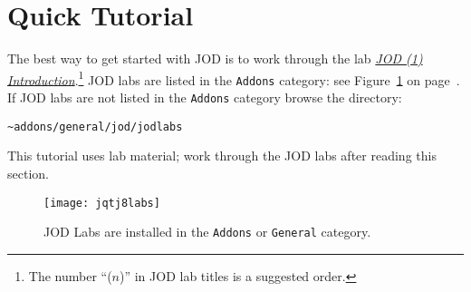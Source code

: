 \section{Quick Tutorial}

The best way to get started with JOD is to work through the
lab \href{https://github.com/bakerjd99/jod/blob/master/jodnotebooks/JODIntroductionLab.pdf}{\emph{JOD (1) Introduction}}.\footnote{The number 
``($n$)'' in JOD lab titles is a suggested order.}
JOD labs are listed in the \texttt{Addons} category: see 
Figure~\ref{eps:jodlabs} on page~\pageref{eps:jodlabs}. If
JOD labs are not listed in the \texttt{Addons} category browse 
the directory:
\begin{lstlisting}[frame=single,framerule=0pt]
~addons/general/jod/jodlabs
\end{lstlisting}
This tutorial uses lab material; work through the JOD labs after reading this section.





\begin{figure}[htbp]
  \centering
  \texttt{[image: jqtj8labs]}
  \caption[JOD Labs]{JOD Labs are installed in the \texttt{Addons} or \texttt{General} category.} 
  \label{eps:jodlabs}
\end{figure}

